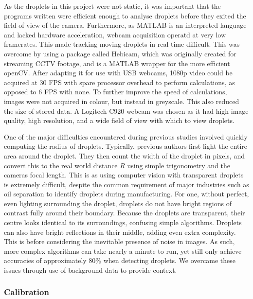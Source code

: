 \documentclass{physics_article_B}
\begin{document}
        As the droplets in this project were not static, it was important that the programs written were efficient enough to analyse droplets before they exited the field of view of the camera. Furthermore, as MATLAB is an interpreted language and lacked hardware acceleration, webcam acquisition operatd at very low framerates. This made tracking moving droplets in real time difficult. This was overcome by using a package called Hebicam\cite{HebiCam}, which was originally created for streaming CCTV footage, and is a MATLAB wrapper for the more efficient openCV. After adapting it for use with USB webcams, 1080p video could be acquired at 30 FPS with spare processor overhead to perform calculations, as opposed to 6 FPS with none. To further improve the speed of calculations, images were not acquired in colour, but instead in greyscale. This also reduced the size of stored data. A Logitech C920 webcam was chosen as it had high image quality, high resolution, and a wide field of view with which to view droplets. 
            
        One of the major difficulties encountered during previous studies involved quickly computing the radius of droplets. Typically, previous authors first light the entire area around the droplet. They then count the width of the droplet in pixels, and convert this to the real world distance $R$ using simple trigonometry and the cameras focal length. This is as using computer vision with transparent droplets is extremely difficult, despite the common requirement of major industries such as oil separation to identify droplets during manufacturing\cite{bubblegeneral}. For one, without perfect, even lighting surrounding the droplet, droplets do not have bright regions of contrast fully around their boundary. Because the droplets are transparent, their centre looks identical to its surroundings, confusing simple algorithms\cite{bubblegeneral}. Droplets can also have bright reflections in their middle, adding even extra complexity. This is before considering the inevitable presence of noise in images. As such, more complex algorithms can take nearly a minute to run, yet still only achieve accuracies of approximately 80\%\cite{bubble2} when detecting droplets. We overcame these issues through use of background data to provide context.

        \subsubsection{Calibration\label{sect:method:vision:calib}}
\end{document}
